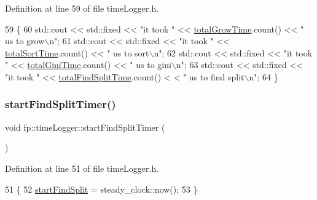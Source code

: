 Definition at line 59 of file time\+Logger.\+h.


\begin{DoxyCode}
59                                            \{
60                     std::cout << std::fixed << \textcolor{stringliteral}{"it took "} << \hyperlink{classfp_1_1timeLogger_ae79b7283b8f150e851fc325c29618ba1}{totalGrowTime}.count() << \textcolor{stringliteral}{" us to
       grow\(\backslash\)n"};
61                     std::cout << std::fixed << \textcolor{stringliteral}{"it took "} << \hyperlink{classfp_1_1timeLogger_a3ac30f8dba0551c3cd3f57dc4806e56e}{totalSortTime}.count() << \textcolor{stringliteral}{" us to
       sort\(\backslash\)n"};
62                     std::cout << std::fixed << \textcolor{stringliteral}{"it took "} << \hyperlink{classfp_1_1timeLogger_a1f1c446894052c4df2100b501069a927}{totalGiniTime}.count() << \textcolor{stringliteral}{" us to
       gini\(\backslash\)n"};
63                     std::cout << std::fixed << \textcolor{stringliteral}{"it took "} << \hyperlink{classfp_1_1timeLogger_a11998b4bff9e1f548f4468e25f79a6f2}{totalFindSplitTime}.count() <
      < \textcolor{stringliteral}{" us to find split\(\backslash\)n"};
64                 \}
\end{DoxyCode}
\mbox{\label{classfp_1_1timeLogger_a59d92a31ff5b1c845dddcc1836323769}} 
\subsubsection{\texorpdfstring{start\+Find\+Split\+Timer()}{startFindSplitTimer()}}
{\footnotesize\ttfamily void fp\+::time\+Logger\+::start\+Find\+Split\+Timer (\begin{DoxyParamCaption}{ }\end{DoxyParamCaption})\hspace{0.3cm}{\ttfamily [inline]}}



Definition at line 51 of file time\+Logger.\+h.


\begin{DoxyCode}
51                                  \{
52 \hyperlink{classfp_1_1timeLogger_a1783656ae0d2e107cdfa87766ddc1a8c}{startFindSplit} = steady\_clock::now();
53                 \}
\end{DoxyCode}
\mbox{\label{classfp_1_1timeLogger_a706a97bf8610b4fd6196352b8e38b48b}} 

